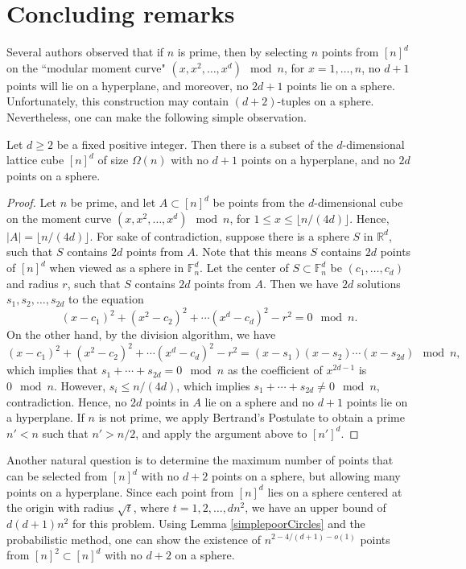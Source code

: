 \section{Concluding remarks}
%
%
Several authors \cite{roth,Le,BK} observed that if $n$ is prime, then by selecting $n$ points from $[n]^d$ on the ``modular moment curve" $(x,x^2,\ldots, x^d) \mod n$, for $x = 1,\ldots, n$, no $d+1$ points will lie on a hyperplane, and moreover, no $2d+1$ points lie on a sphere.  Unfortunately, this construction may contain $(d+2)$-tuples on a sphere.  Nevertheless, one can make the following simple observation.
%
%
%
%
\begin{theorem}\label{mcurve} Let $d \geq 2$ be a fixed positive integer. Then there is a subset of the $d$-dimensional lattice cube $[n]^d$ of size $\Omega(n)$ with no $d + 1$ points on a hyperplane, and no $2d$ points on a sphere.
\end{theorem}
%
%
%
%
\begin{proof} 
%
Let $n$ be prime, and let $A\subset [n]^d$ be points from the $d$-dimensional cube on the moment curve $(x,x^2,\ldots, x^d) \mod n$, for $1 \leq x \leq \lfloor n/(4d)\rfloor$. Hence, $|A| = \lfloor n/(4d)\rfloor$.  For sake of contradiction, suppose there is a sphere $S$ in $\mathbb{R}^d$, such that $S$ contains $2d$ points from $A$. Note that this means $S$ contains $2d$ points of $[n]^d$ when viewed as a sphere in $\mathbb{F}_n^d$. Let the center of $S \subset \mathbb{F}_n^d$ be $(c_1,\ldots, c_d)$ and radius $r$, such that $S$ contains $2d$ points from $A$. Then we have $2d$ solutions $s_1,s_2,\ldots, s_{2d}$ to the equation
%
$$(x-c_1)^2 + (x^2 - c_2)^2 + \cdots (x^d - c_d)^2 - r^2 = 0 \mod n.$$
%
%
    \noindent On the other hand, by the division algorithm, we have
%
%
    $$(x-c_1)^2 + (x^2 - c_2)^2 + \cdots (x^d - c_d)^2 - r^2  = (x - s_1)(x-s_2)\cdots (x-s_{2d})  \mod n,$$
%
    \noindent which implies that $s_1 + \cdots +s_{2d} = 0 \mod n$ as the coefficient of $x^{2d-1}$ is $0\mod n$.  However, $s_i \leq  n/(4d)$, which implies $s_1 + \cdots +s_{2d} \neq 0 \mod n$, contradiction.  Hence, no $2d$ points in $A$ lie on a sphere and no $d+1$ points lie on a hyperplane.  If $n$ is not prime, we apply Bertrand's Postulate to obtain a prime $n' < n$ such that $n' > n/2$, and apply the argument above to $[n']^d$.\end{proof}
%
%
%
%
%
%
Another natural question is to determine the maximum number of points that can be selected from $[n]^d$ with no $d+2$ points on a sphere, but allowing many points on a hyperplane.  Since each point from $[n]^d$ lies on a sphere centered at the origin with radius $\sqrt{t}$, where $t  = 1,2,\ldots, dn^2$, we have an upper bound of $d(d+1)n^2$ for this problem. Using Lemma \ref{simplepoorCircles} and the probabilistic method, one can show the existence of $n^{2 - 4/(d+1) - o(1)}$ points from $[n]^2 \subset [n]^d$ with no $d+2$ on a sphere.   
%
%
%
